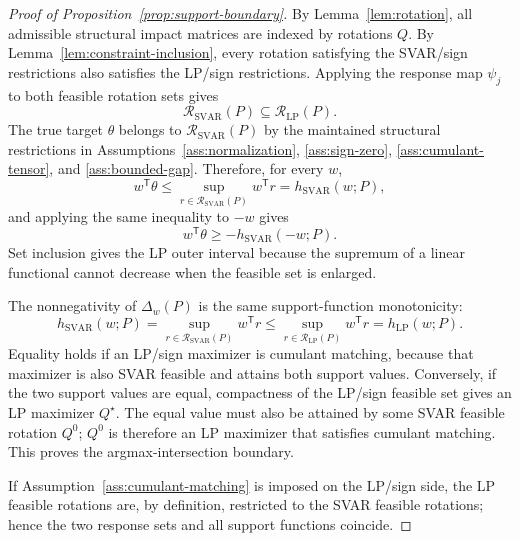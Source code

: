 \documentclass[11pt]{article}
\newcommand{\transpose}{\mathsf{T}}
\theoremstyle{definition}
\theoremstyle{plain}
\theoremstyle{remark}
\begin{document}
\begin{proof}[Proof of Proposition~\ref{prop:support-boundary}]
By Lemma~\ref{lem:rotation}, all admissible structural impact matrices are
indexed by rotations \(Q\).  By Lemma~\ref{lem:constraint-inclusion}, every
rotation satisfying the SVAR/sign restrictions also satisfies the LP/sign
restrictions.  Applying the response map \(\psi_j\) to both feasible rotation
sets gives
\[
\mathcal R_{\mathrm{SVAR}}(P)\subseteq \mathcal R_{\mathrm{LP}}(P).
\]
The true target \(\theta\) belongs to \(\mathcal R_{\mathrm{SVAR}}(P)\) by the
maintained structural restrictions in Assumptions~\ref{ass:normalization},
\ref{ass:sign-zero}, \ref{ass:cumulant-tensor}, and \ref{ass:bounded-gap}.
Therefore, for every \(w\),
\[
w^\transpose\theta
\le \sup_{r\in\mathcal R_{\mathrm{SVAR}}(P)}w^\transpose r
=h_{\mathrm{SVAR}}(w;P),
\]
and applying the same inequality to \(-w\) gives
\[
w^\transpose\theta\ge -h_{\mathrm{SVAR}}(-w;P).
\]
Set inclusion gives the LP outer interval because the supremum of a linear
functional cannot decrease when the feasible set is enlarged.

The nonnegativity of \(\Delta_w(P)\) is the same support-function monotonicity:
\[
h_{\mathrm{SVAR}}(w;P)
=\sup_{r\in\mathcal R_{\mathrm{SVAR}}(P)}w^\transpose r
\le
\sup_{r\in\mathcal R_{\mathrm{LP}}(P)}w^\transpose r
=h_{\mathrm{LP}}(w;P).
\]
Equality holds if an LP/sign maximizer is cumulant matching, because that
maximizer is also SVAR feasible and attains both support values.  Conversely,
if the two support values are equal, compactness of the LP/sign feasible set
gives an LP maximizer \(Q^\star\).  The equal value must also be attained by
some SVAR feasible rotation \(Q^0\); \(Q^0\) is therefore an LP maximizer that
satisfies cumulant matching.  This proves the argmax-intersection boundary.

If Assumption~\ref{ass:cumulant-matching} is imposed on the LP/sign side, the
LP feasible rotations are, by definition, restricted to the SVAR feasible
rotations; hence the two response sets and all support functions coincide.
\end{proof}
\end{document}
